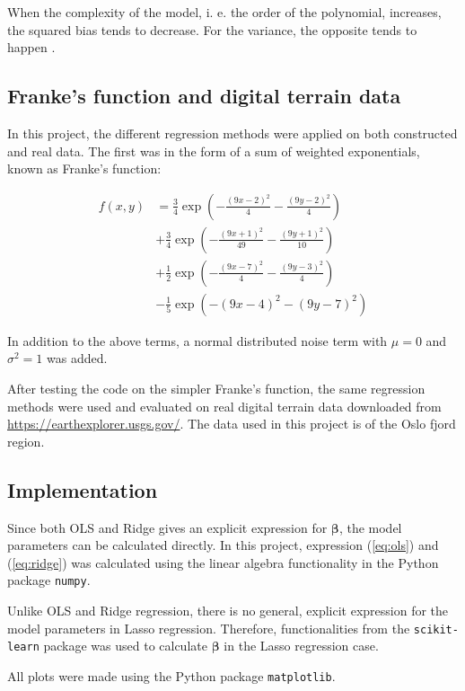 When the complexity of the model, i. e. the order of the polynomial, increases, the squared bias tends to decrease. For the variance, the opposite tends to happen \citep{hastie2009elements}.

\subsection{Franke's function and digital terrain data}
In this project, the different regression methods were applied on both constructed and real data. The first was in the form of a sum of weighted exponentials, known as Franke's function:

\begin{align*}
	f\left(x,y\right) &=\frac{3}{4}\exp\left(-\frac{\left(9x-2\right)^2}{4}-\frac{\left(9y-2\right)^2}{4} \right) \\
	&+\frac{3}{4}\exp\left(-\frac{\left(9x+1\right)^2}{49}-\frac{\left(9y+1\right)^2}{10} \right) \\
	&+\frac{1}{2}\exp\left(-\frac{\left(9x-7\right)^2}{4}-\frac{\left(9y-3\right)^2}{4} \right) \\
	&-\frac{1}{5}\exp\left(-\left(9x-4\right)^2-\left(9y-7\right)^2 \right)
\end{align*}

In addition to the above terms, a normal distributed noise term with $\mu = 0$ and $\sigma^2 = 1$ was added.

After testing the code on the simpler Franke's function, the same regression methods were used and evaluated on real digital terrain data downloaded from \url{https://earthexplorer.usgs.gov/}. The data used in this project is of the Oslo fjord region.

\subsection{Implementation}
Since both OLS and Ridge gives an explicit expression for $\boldsymbol{\beta}$, the model parameters can be calculated directly. In this project, expression (\ref{eq:ols}) and (\ref{eq:ridge}) was calculated using the linear algebra functionality in the Python package \texttt{numpy}.

Unlike OLS and Ridge regression, there is no general, explicit expression for the model parameters in Lasso regression. Therefore, functionalities from the \texttt{scikit-learn} package was used to calculate $\boldsymbol{\beta}$  in the Lasso regression case.



All plots were made using the Python package \texttt{matplotlib}.
